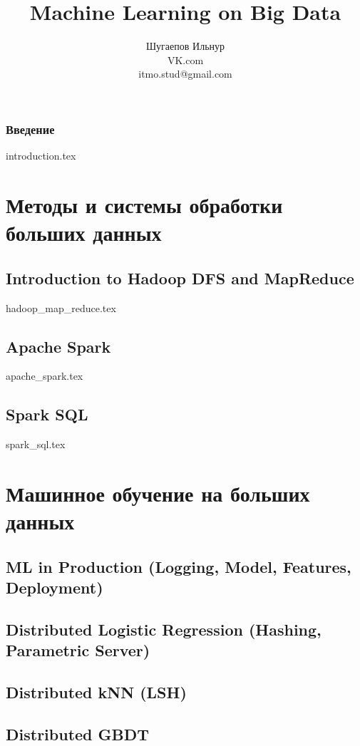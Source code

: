 \documentclass[openany,12pt]{book}
\title{Machine Learning on Big Data}
\author{Шугаепов Ильнур 
\\
\small{VK.com} 
\\
\small{itmo.stud@gmail.com}}
\date{}
\numberwithin{equation}{section}
\begin{document}
\maketitle

\tableofcontents

\section*{Введение}
{introduction.tex}
 
\part{Методы и системы обработки больших данных}
\chapter{Introduction to Hadoop DFS and MapReduce}
{hadoop_map_reduce.tex}


\chapter{Apache Spark}
{apache_spark.tex}

\chapter{Spark SQL}
{spark_sql.tex}

\part{Машинное обучение на больших данных}
\chapter{ML in Production (Logging, Model, Features, Deployment)}

\chapter{Distributed Logistic Regression (Hashing, Parametric Server)}

\chapter{Distributed kNN (LSH)}

\chapter{Distributed GBDT}
\end{document}
